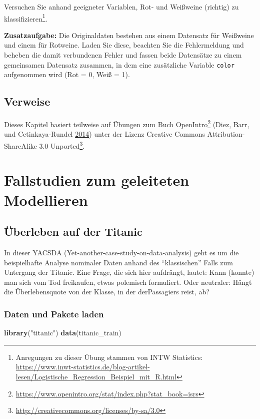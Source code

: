 \documentclass[12pt,ngerman,]{book}
\makeatletter
\newenvironment{Shaded}{\begin{snugshade}}{\end{snugshade}}
\newcommand{\KeywordTok}[1]{\textcolor[rgb]{0.13,0.29,0.53}{\textbf{{#1}}}}
\newcommand{\StringTok}[1]{\textcolor[rgb]{0.31,0.60,0.02}{{#1}}}
\newcommand{\NormalTok}[1]{{#1}}
\let\rmarkdownfootnote\footnote%
\def\footnote{\protect\rmarkdownfootnote}
\renewcommand{\href}[2]{#2\footnote{\url{#1}}}
\newenvironment{kframe}{%
\medskip{}
\setlength{\fboxsep}{.8em}
 \def\at@end@of@kframe{}%
 \ifinner\ifhmode%
  \def\at@end@of@kframe{\end{minipage}}%
  \begin{minipage}{\columnwidth}%
 \fi\fi%
 \def\FrameCommand##1{\hskip\@totalleftmargin \hskip-\fboxsep
 \colorbox{shadecolor}{##1}\hskip-\fboxsep
     \hskip-\linewidth \hskip-\@totalleftmargin \hskip\columnwidth}%
 \MakeFramed {\advance\hsize-\width
   \@totalleftmargin\z@ \linewidth\hsize
   \@setminipage}}%
 {\par\unskip\endMakeFramed%
 \at@end@of@kframe}
\renewenvironment{Shaded}{\begin{kframe}}{\end{kframe}}
\makeatother
\begin{document}
Versuchen Sie anhand geeigneter Variablen, Rot- und Weißweine (richtig)
zu klassifizieren\footnote{Anregungen zu dieser Übung stammen von INTW
  Statistics:
  \url{https://www.inwt-statistics.de/blog-artikel-lesen/Logistische_Regression_Beispiel_mit_R.html}}.

\textbf{Zusatzaufgabe:} Die Originaldaten bestehen aus einem Datensatz
für Weißweine und einem für Rotweine. Laden Sie diese, beachten Sie die
Fehlermeldung und beheben die damit verbundenen Fehler und fassen beide
Datensätze zu einem gemeinsamen Datensatz zusammen, in dem eine
zusätzliche Variable \texttt{color} aufgenommen wird (Rot = 0, Weiß =
1).

\section{Verweise}\label{verweise-7}

Dieses Kapitel basiert teilweise auf Übungen zum Buch
\href{https://www.openintro.org/stat/index.php?stat_book=isrs}{OpenIntro}
(Diez, Barr, und Cetinkaya-Rundel
\protect\hyperlink{ref-introstats}{2014}) unter der Lizenz
\href{http://creativecommons.org/licenses/by-sa/3.0}{Creative Commons
Attribution-ShareAlike 3.0 Unported}.

\chapter{Fallstudien zum geleiteten
Modellieren}\label{fallstudien-zum-geleiteten-modellieren}

\section{Überleben auf der Titanic}\label{uberleben-auf-der-titanic}

In dieser YACSDA (Yet-another-case-study-on-data-analysis) geht es um
die beispielhafte Analyse nominaler Daten anhand des ``klassischen''
Falls zum Untergang der Titanic. Eine Frage, die sich hier aufdrängt,
lautet: Kann (konnte) man sich vom Tod freikaufen, etwas polemisch
formuliert. Oder neutraler: Hängt die Überlebensquote von der Klasse, in
der derPassagiers reist, ab?

\subsection{Daten und Pakete laden}\label{daten-und-pakete-laden}

\begin{Shaded}
\begin{Highlighting}[]
\KeywordTok{library}\NormalTok{(}\StringTok{"titanic"}\NormalTok{)}
\KeywordTok{data}\NormalTok{(titanic_train)}
\end{Highlighting}
\end{Shaded}
\end{document}
